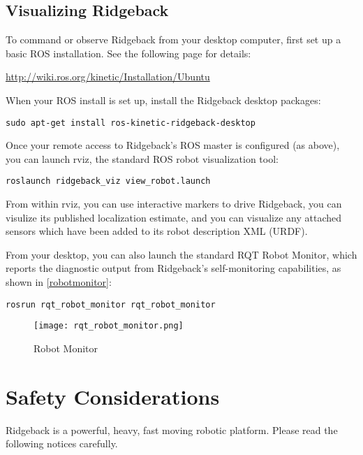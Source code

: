 \documentclass[]{clearpath-latex/clearpath-manual}
\begin{document}
\subsection{Visualizing Ridgeback}

To command or observe Ridgeback from your desktop computer, first set up a basic ROS installation.  See the following page for details:

\url{http://wiki.ros.org/kinetic/Installation/Ubuntu}

When your ROS install is set up, install the Ridgeback desktop packages:

\begin{lstlisting}
sudo apt-get install ros-kinetic-ridgeback-desktop
\end{lstlisting}

Once your remote access to Ridgeback's ROS master is configured (as above), you can launch rviz, the standard ROS robot visualization tool:

\begin{lstlisting}
roslaunch ridgeback_viz view_robot.launch
\end{lstlisting}

From within rviz, you can use interactive markers to drive Ridgeback, you can visulize its published localization estimate, and you can visualize any attached sensors which have been added to its robot description XML (URDF).

\pagebreak[4]

From your desktop, you can also launch the standard RQT Robot Monitor, which reports the diagnostic output from Ridgeback's self-monitoring capabilities, as shown in \autoref{robotmonitor}:

\begin{lstlisting}
rosrun rqt_robot_monitor rqt_robot_monitor
\end{lstlisting}

\begin{figure}[!htb]
  \centering
  \texttt{[image: rqt\_robot\_monitor.png]}
  \caption{Robot Monitor}
  \label{robotmonitor}
\end{figure}


\section{Safety Considerations}

Ridgeback is a powerful, heavy, fast moving robotic platform. Please read the following notices carefully.
\end{document}
